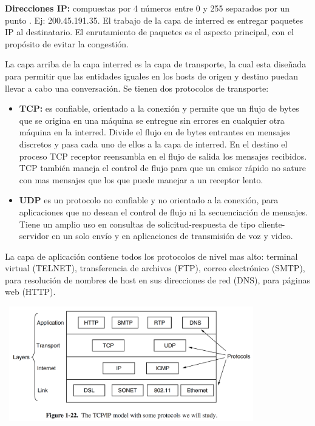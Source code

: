 \documentclass[10pt,a4paper]{report}
\begin{document}
	\par \textbf{Direcciones IP:} compuestas por 4 números entre 0 y 255 separados por un punto . Ej: 200.45.191.35. El trabajo de la capa de interred es entregar paquetes IP al destinatario. El enrutamiento de paquetes es el aspecto principal, con el propósito de evitar la congestión.

 	\par La capa arriba de la capa interred es la capa de transporte, la cual esta diseñada para permitir que las entidades iguales en los hosts de origen y destino puedan llevar a cabo una conversación. Se tienen dos protocolos de transporte:

	\begin{itemize}
		\item \textbf{TCP:} es confiable, orientado a la conexión y permite que un flujo de bytes que se origina en una máquina se entregue sin errores en cualquier otra máquina en la interred. Divide el flujo en de bytes entrantes en mensajes discretos y pasa cada uno de ellos a la capa de interred. En el destino el proceso TCP receptor reensambla en el flujo de salida los mensajes recibidos. TCP también maneja el control de flujo para que un emisor rápido no sature con mas mensajes que los que puede manejar a un receptor lento.
		\item \textbf{UDP} es un protocolo no confiable y no orientado a la conexión, para aplicaciones que no desean el control de flujo ni la secuenciación de mensajes. Tiene un amplio uso en consultas de solicitud-respuesta de tipo cliente-servidor en un solo envío y en aplicaciones de transmisión de voz y video.
	\end{itemize}

	\par La capa de aplicación contiene todos los protocolos de nivel mas alto: terminal virtual (TELNET), transferencia de archivos (FTP), correo electrónico (SMTP), para resolución de nombres de host en sus direcciones de red (DNS), para páginas web (HTTP).

	\begin{center}
		\includegraphics[width=11cm, height=5cm]{./imagenes/esquema.png} 
	\end{center}
	
\end{document}
